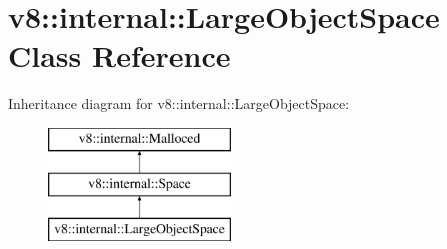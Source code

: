 \hypertarget{classv8_1_1internal_1_1_large_object_space}{}\section{v8\+:\+:internal\+:\+:Large\+Object\+Space Class Reference}
\label{classv8_1_1internal_1_1_large_object_space}
Inheritance diagram for v8\+:\+:internal\+:\+:Large\+Object\+Space\+:\begin{figure}[H]
\begin{center}
\leavevmode
\includegraphics[height=3.000000cm]{classv8_1_1internal_1_1_large_object_space}
\end{center}
\end{figure}

